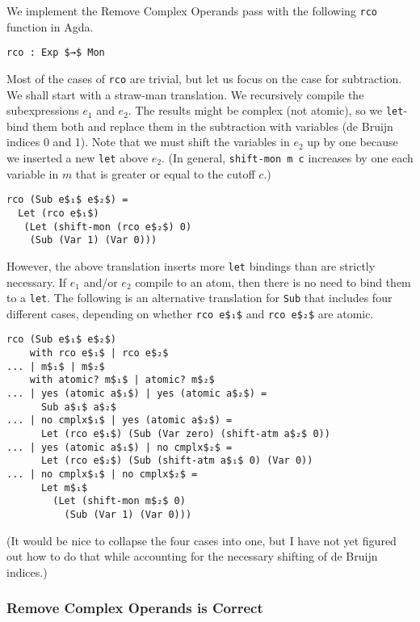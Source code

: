 \documentclass[sigplan,review,dvipsnames,screen,10pt]{acmart}
\begin{document}
We implement the Remove Complex Operands pass with the following
\lstinline{rco} function in Agda.
\begin{lstlisting}
rco : Exp $→$ Mon
\end{lstlisting}

Most of the cases of \lstinline{rco} are trivial, but let us focus on
the case for subtraction. We shall start with a straw-man
translation. We recursively compile the subexpressions $e_1$ and
$e_2$. The results might be complex (not atomic), so we
\lstinline{let}-bind them both and replace them in the subtraction
with variables (de Bruijn indices 0 and 1). Note that we must shift
the variables in $e_2$ up by one because we inserted a new
\lstinline{let} above $e_2$. (In general, \lstinline{shift-mon m c}
increases by one each variable in $m$ that is greater or equal to the
cutoff $c$.)

\begin{lstlisting}
rco (Sub e$₁$ e$₂$) =
  Let (rco e$₁$)
   (Let (shift-mon (rco e$₂$) 0)
    (Sub (Var 1) (Var 0)))
\end{lstlisting}

However, the above translation inserts more \lstinline{let} bindings
than are strictly necessary. If $e_1$ and/or $e_2$ compile to an atom,
then there is no need to bind them to a \lstinline{let}.  The
following is an alternative translation for \lstinline{Sub} that
includes four different cases, depending on whether \lstinline{rco e$₁$}
and \lstinline{rco e$₂$} are atomic.

\begin{lstlisting}
rco (Sub e$₁$ e$₂$)
    with rco e$₁$ | rco e$₂$
... | m$₁$ | m$₂$
    with atomic? m$₁$ | atomic? m$₂$
... | yes (atomic a$₁$) | yes (atomic a$₂$) =
      Sub a$₁$ a$₂$
... | no cmplx$₁$ | yes (atomic a$₂$) =
      Let (rco e$₁$) (Sub (Var zero) (shift-atm a$₂$ 0))
... | yes (atomic a$₁$) | no cmplx$₂$ =
      Let (rco e$₂$) (Sub (shift-atm a$₁$ 0) (Var 0))
... | no cmplx$₁$ | no cmplx$₂$ = 
      Let m$₁$
        (Let (shift-mon m$₂$ 0)
          (Sub (Var 1) (Var 0)))
\end{lstlisting}

(It would be nice to collapse the four cases into one, but I have not
yet figured out how to do that while accounting for the necessary
shifting of de Bruijn indices.)

\subsubsection{Remove Complex Operands is Correct}
\end{document}
